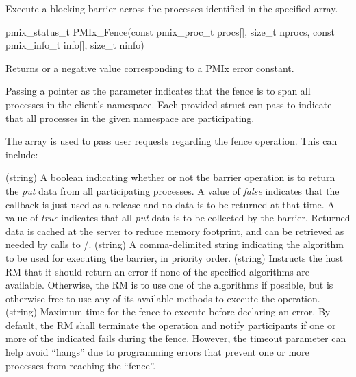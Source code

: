 \summary

Execute a blocking barrier across the processes identified in the specified array.

\format

\cspecificstart
\begin{codepar}
pmix_status_t
PMIx_Fence(const pmix_proc_t procs[], size_t nprocs,
           const pmix_info_t info[], size_t ninfo)
\end{codepar}
\cspecificend

\begin{arglist}
\end{arglist}

Returns  or a negative value corresponding to a PMIx error constant.

\descr

Passing a  pointer as the  parameter indicates that the fence is to span all processes in the client's namespace.
Each provided  struct can pass  to indicate that all processes in the given namespace are participating.

The  array is used to pass user requests regarding the fence operation.
This can include:


\begin{attributedesc}
%
 (string)
A boolean indicating whether or not the barrier operation is to return the \emph{put} data from all participating processes.
A value of \emph{false} indicates that the callback is just used as a release and no data is to be returned at that time.
A value of \emph{true} indicates that all \emph{put} data is to be collected by the barrier.
Returned data is cached at the server to reduce memory footprint, and can be retrieved as needed by calls to /.
%
 (string)
A comma-delimited string indicating the algorithm to be used for executing the barrier, in priority order.
%
 (string)
Instructs the host \ac{RM} that it should return an error if none of the specified algorithms are available.
Otherwise, the \ac{RM} is to use one of the algorithms if possible, but is otherwise free to use any of its available methods to execute the operation.
%
 (string)
Maximum time for the fence to execute before declaring an error.
By default, the \ac{RM} shall terminate the operation and notify participants if one or more of the indicated  fails during the fence.
However, the timeout parameter can help avoid ``hangs'' due to programming errors that prevent one or more processes from reaching the ``fence''.
%
\end{attributedesc}

